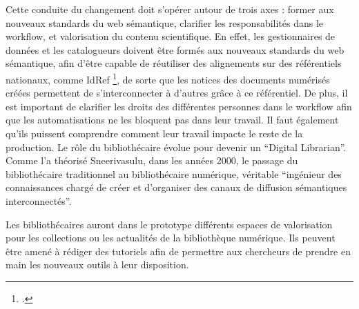 Cette conduite du changement doit s'opérer autour de trois axes : former aux nouveaux standards du web sémantique, clarifier les responsabilités dans le workflow, et valorisation du contenu scientifique. En effet, les gestionnaires de données et les catalogueurs doivent être formés aux nouveaux standards du web sémantique, afin d'être capable de réutiliser des alignements sur des référentiels nationaux, comme IdRef \footcite{martinolliEnrichirSesDonnees2025}, de sorte que les notices des documents numérisés créées permettent de s'interconnecter à d'autres grâce à ce référentiel. De plus, il est important de clarifier les droits des différentes personnes dans le workflow afin que les automatisations ne les bloquent pas dans leur travail. Il faut également qu'ils puissent comprendre comment leur travail impacte le reste de la production. Le rôle du bibliothécaire évolue pour devenir un \enquote{Digital Librarian}. Comme l'a théorisé Sneerivasulu, dans les années 2000, le passage du bibliothécaire traditionnel au bibliothécaire numérique, véritable \enquote{ingénieur des connaissances chargé de créer et d'organiser des canaux de diffusion sémantiques interconnectés}.

Les bibliothécaires auront dans le prototype différents espaces de valorisation pour les collections ou les actualités de la bibliothèque numérique. Ils peuvent être amené à rédiger des tutoriels afin de permettre aux chercheurs de prendre en main les nouveaux outils à leur disposition.